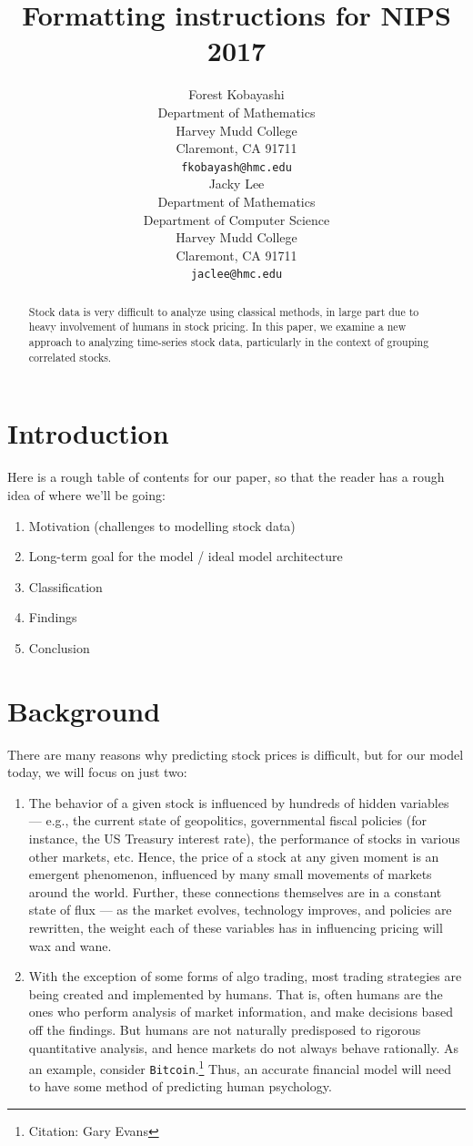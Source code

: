 \documentclass[final]{article}
\title{Formatting instructions for NIPS 2017}
\author{
  Forest Kobayashi \\
  Department of Mathematics\\
  Harvey Mudd College\\
  Claremont, CA 91711 \\
  \texttt{fkobayash@hmc.edu} \\
  \And
  Jacky Lee \\
  Department of Mathematics\\
  Department of Computer Science \\
  Harvey Mudd College \\
  Claremont, CA 91711 \\
  \texttt{jaclee@hmc.edu}
}
\begin{document}

\maketitle

\begin{abstract}
  Stock data is very difficult to analyze using classical methods, in
  large part due to heavy involvement of humans in stock pricing. In
  this paper, we examine a new approach to analyzing time-series stock
  data, particularly in the context of grouping correlated stocks.
\end{abstract}

\section{Introduction}
Here is a rough table of contents for our paper, so that the reader
has a rough idea of where we'll be going:
\begin{enumerate}
  \item Motivation (challenges to modelling stock data)
  \item Long-term goal for the model / ideal model architecture
  \item Classification
  \item Findings
  \item Conclusion
\end{enumerate}

\section{Background}
There are many reasons why predicting stock prices is difficult, but
for our model today, we will focus on just two:
\begin{enumerate}
  \item The behavior of a given stock is influenced by hundreds of
    hidden variables --- e.g., the current state of geopolitics,
    governmental fiscal policies (for instance, the US Treasury
    interest rate), the performance of stocks in various other
    markets, etc. Hence, the price of a stock at any given moment is
    an emergent phenomenon, influenced by many small movements of
    markets around the world. Further, these connections themselves
    are in a constant state of flux --- as the market evolves,
    technology improves, and policies are rewritten, the weight each
    of these variables has in influencing pricing will wax and wane.
  \item With the exception of some forms of algo trading, most trading
    strategies are being created and implemented by humans. That is,
    often humans are the ones who perform analysis of market
    information, and make decisions based off the findings. But humans
    are not naturally predisposed to rigorous quantitative analysis,
    and hence markets do not always behave rationally. As an example,
    consider \texttt{Bitcoin}.\footnote{Citation: Gary Evans} Thus,
    an accurate financial model will need to have some method of
    predicting human psychology.
\end{enumerate}
\end{document}
